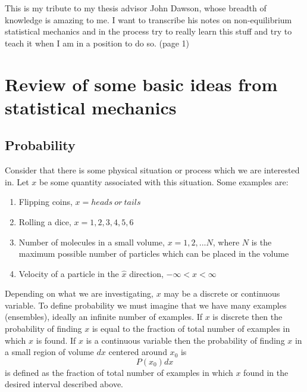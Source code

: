 \documentclass[aps,prl,preprint,showpacs]{revtex4}
\begin{document}
This is my tribute to my thesis advisor John Dawson, whose breadth of 
knowledge is amazing to me.  I want to transcribe his notes on 
non-equilibrium statistical mechanics and in the process try to really
learn this stuff and try to teach it when I am in a position to do so.
(page 1)

\section{Review of some basic ideas from statistical
mechanics}
\subsection{Probability}

Consider that there is some physical situation or process which we are 
interested in. Let $x$ be some quantity associated with this situation. 
Some examples are:
\begin{enumerate}
\item Flipping coins, $x = heads \ or \ tails$
\item Rolling a dice, $x = 1,2,3,4,5,6$
\item Number of molecules in a small volume, $x = 1,2,...N$,
where $N$ is the maximum possible number of particles which can 
be placed in the volume
\item Velocity of a particle in the $\hat{x}$ direction,
$-\infty < x < \infty$
\end{enumerate}

Depending on what we are investigating, $x$ may be a discrete or
continuous variable.  To define probability we must imagine that we have 
many examples (ensembles), ideally an infinite number of examples.  If 
$x$ is discrete then the probability of finding $x$ is equal to the
fraction of total number of examples in which $x$ is found.  If $x$
is a continuous variable then the probability of finding $x$
in a small region of volume $dx$ centered around $x_0$ is
\[
P(x_0) dx
\]
is defined as the fraction of total number of examples in which $x$ 
found in the desired interval described above.
\end{document}
